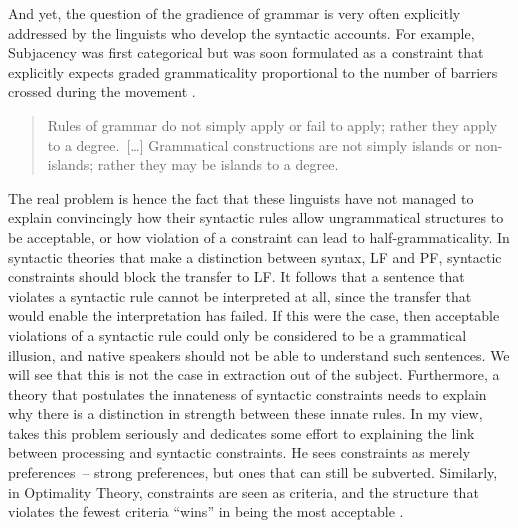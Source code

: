 And yet, the question of the gradience of grammar is very often explicitly addressed by the linguists who develop the syntactic accounts. %
For example, Subjacency was first categorical \citep{Chomsky.1973} but was soon formulated as a constraint that explicitly expects graded grammaticality proportional to the number of barriers crossed during the movement \citep{Chomsky.1986}. 

\begin{quote}
    Rules of grammar do not simply apply or fail to apply; rather they apply to a degree.~[\dots] Grammatical constructions are not simply islands or non-islands; rather they may be islands to a degree. \citep[271]{Lakoff.1973}
\end{quote}

The real problem is hence the fact that these linguists have not managed to explain convincingly how their syntactic rules allow ungrammatical structures to be acceptable, or how violation of a constraint can lead to half-grammaticality. In syntactic theories that make a distinction between syntax, LF and PF, syntactic constraints should block the transfer to LF. It follows that a sentence that violates a syntactic rule cannot be interpreted at all, since the transfer that would enable the interpretation has failed. If this were the case, then acceptable violations of a syntactic rule could only be considered to be a grammatical illusion, and native speakers should not be able to understand such sentences. We will see that this is not the case in extraction out of the subject. Furthermore, a theory that postulates the innateness of syntactic constraints needs to explain why there is a distinction in strength between these innate rules. In my view, \citet[Chapter~1]{Uriagereka.2012} takes this problem seriously and dedicates some effort to explaining the link between processing and syntactic constraints. He sees constraints as merely preferences~-- strong preferences, but ones that can still be subverted. Similarly, in Optimality Theory, constraints are seen as criteria, and the structure that violates the fewest criteria ``wins'' in being the most acceptable \citep{Keller.2000}.

